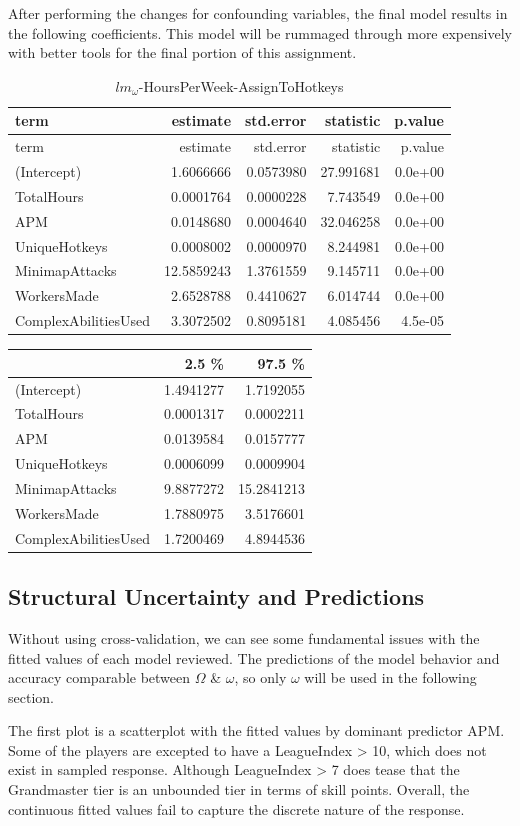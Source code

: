 \documentclass[]{article}
\begin{document}
After performing the changes for confounding variables, the final model
results in the following coefficients. This model will be rummaged
through more expensively with better tools for the final portion of this
assignment.

\begin{longtable}[]{@{}lrrrr@{}}
\caption{\(lm_\omega\)-HoursPerWeek-AssignToHotkeys}\tabularnewline
\toprule
term & estimate & std.error & statistic & p.value\tabularnewline
\midrule
\endfirsthead
\toprule
term & estimate & std.error & statistic & p.value\tabularnewline
\midrule
\endhead
(Intercept) & 1.6066666 & 0.0573980 & 27.991681 & 0.0e+00\tabularnewline
TotalHours & 0.0001764 & 0.0000228 & 7.743549 & 0.0e+00\tabularnewline
APM & 0.0148680 & 0.0004640 & 32.046258 & 0.0e+00\tabularnewline
UniqueHotkeys & 0.0008002 & 0.0000970 & 8.244981 &
0.0e+00\tabularnewline
MinimapAttacks & 12.5859243 & 1.3761559 & 9.145711 &
0.0e+00\tabularnewline
WorkersMade & 2.6528788 & 0.4410627 & 6.014744 & 0.0e+00\tabularnewline
ComplexAbilitiesUsed & 3.3072502 & 0.8095181 & 4.085456 &
4.5e-05\tabularnewline
\bottomrule
\end{longtable}

\begin{longtable}[]{@{}lrr@{}}
\toprule
& 2.5 \% & 97.5 \%\tabularnewline
\midrule
\endhead
(Intercept) & 1.4941277 & 1.7192055\tabularnewline
TotalHours & 0.0001317 & 0.0002211\tabularnewline
APM & 0.0139584 & 0.0157777\tabularnewline
UniqueHotkeys & 0.0006099 & 0.0009904\tabularnewline
MinimapAttacks & 9.8877272 & 15.2841213\tabularnewline
WorkersMade & 1.7880975 & 3.5176601\tabularnewline
ComplexAbilitiesUsed & 1.7200469 & 4.8944536\tabularnewline
\bottomrule
\end{longtable}

\hypertarget{structural-uncertainty-and-predictions}{%
\subsection{Structural Uncertainty and
Predictions}\label{structural-uncertainty-and-predictions}}

Without using cross-validation, we can see some fundamental issues with
the fitted values of each model reviewed. The predictions of the model
behavior and accuracy comparable between \(\Omega\) \& \(\omega\), so
only \(\omega\) will be used in the following section.

The first plot is a scatterplot with the fitted values by dominant
predictor APM. Some of the players are excepted to have a LeagueIndex
\textgreater{} 10, which does not exist in sampled response. Although
LeagueIndex \textgreater{} 7 does tease that the Grandmaster tier is an
unbounded tier in terms of skill points. Overall, the continuous fitted
values fail to capture the discrete nature of the response.
\end{document}
